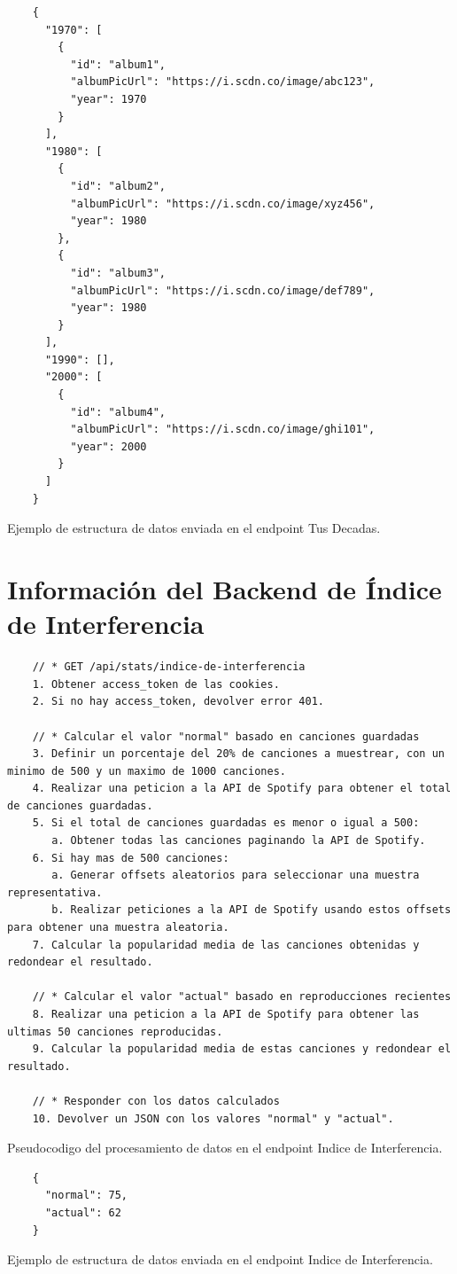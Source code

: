 \begin{ifalgorithm}[H]
    \begin{lstlisting}
    {
      "1970": [
        {
          "id": "album1",
          "albumPicUrl": "https://i.scdn.co/image/abc123",
          "year": 1970
        }
      ],
      "1980": [
        {
          "id": "album2",
          "albumPicUrl": "https://i.scdn.co/image/xyz456",
          "year": 1980
        },
        {
          "id": "album3",
          "albumPicUrl": "https://i.scdn.co/image/def789",
          "year": 1980
        }
      ],
      "1990": [],
      "2000": [
        {
          "id": "album4",
          "albumPicUrl": "https://i.scdn.co/image/ghi101",
          "year": 2000
        }
      ]
    }
    \end{lstlisting}
    \caption{Ejemplo de estructura de datos enviada en el endpoint Tus Decadas.}
    \label{alg:tus_decadas_response}
\end{ifalgorithm}

\section{Información del Backend de Índice de Interferencia} \label{sec:backend_indice_de_interferencia}

\begin{ifalgorithm}[H]
    \begin{lstlisting}
    // * GET /api/stats/indice-de-interferencia
    1. Obtener access_token de las cookies.
    2. Si no hay access_token, devolver error 401.

    // * Calcular el valor "normal" basado en canciones guardadas
    3. Definir un porcentaje del 20% de canciones a muestrear, con un minimo de 500 y un maximo de 1000 canciones.
    4. Realizar una peticion a la API de Spotify para obtener el total de canciones guardadas.
    5. Si el total de canciones guardadas es menor o igual a 500:
       a. Obtener todas las canciones paginando la API de Spotify.
    6. Si hay mas de 500 canciones:
       a. Generar offsets aleatorios para seleccionar una muestra representativa.
       b. Realizar peticiones a la API de Spotify usando estos offsets para obtener una muestra aleatoria.
    7. Calcular la popularidad media de las canciones obtenidas y redondear el resultado.

    // * Calcular el valor "actual" basado en reproducciones recientes
    8. Realizar una peticion a la API de Spotify para obtener las ultimas 50 canciones reproducidas.
    9. Calcular la popularidad media de estas canciones y redondear el resultado.

    // * Responder con los datos calculados
    10. Devolver un JSON con los valores "normal" y "actual".
    \end{lstlisting}
    \caption{Pseudocodigo del procesamiento de datos en el endpoint Indice de Interferencia.}
    \label{alg:indice_interferencia}
\end{ifalgorithm}

\begin{ifalgorithm}[H]
    \begin{lstlisting}
    {
      "normal": 75,
      "actual": 62
    }
    \end{lstlisting}
    \caption{Ejemplo de estructura de datos enviada en el endpoint Indice de Interferencia.}
    \label{alg:indice_interferencia_response}
\end{ifalgorithm}





